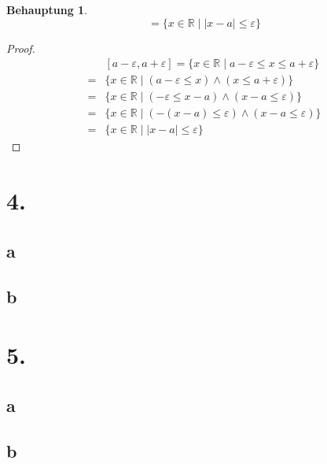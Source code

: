 \documentclass[a4paper,10pt]{article}
\newtheorem*{claim}{Behauptung}
\begin{document}
\begin{claim}
 \begin{equation*}
  [a - \varepsilon, a + \varepsilon] = \{x \in \mathbb{R} \mid |x - a| \le \varepsilon\}
 \end{equation*}
\end{claim}

\begin{proof}
 \begin{align*}
  & [a - \varepsilon, a + \varepsilon] = \{x \in \mathbb{R} \mid a - \varepsilon \le x \le a + \varepsilon\}\\
  = & \{x \in \mathbb{R} \mid (a - \varepsilon \le x) \land (x \le a + \varepsilon)\}\\
  = & \{x \in \mathbb{R} \mid (-\varepsilon \le x - a) \land (x - a \le \varepsilon)\}\\
  = & \{x \in \mathbb{R} \mid (-(x - a) \le \varepsilon) \land (x - a \le \varepsilon)\}\\
  = & \{x \in \mathbb{R} \mid |x - a| \le \varepsilon\}
 \end{align*}
\end{proof}

\section*{4.}

\subsection*{a}

\subsection*{b}

\section*{5.}

\subsection*{a}

\subsection*{b}
\end{document}
